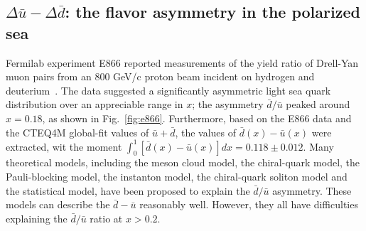 \subsection{$\Delta \bar{u} - \Delta \bar{d}$: the flavor asymmetry in the polarized sea}
 Fermilab experiment E866 reported measurements of the 
 yield ratio of Drell-Yan muon pairs
 from an 800 GeV/c proton beam incident on hydrogen and deuterium~\cite{e8661,e8662}. 
The data suggested a significantly  asymmetric light sea quark distribution over an 
 appreciable range in $x$; the asymmetry $\bar{d}/\bar{u}$ peaked around $x=0.18$, as shown in Fig.~\ref{fig:e866}.
 Furthermore, based on the E866 data and the CTEQ4M global-fit values of $\bar{u}+\bar{d}$,  
 the values of $\bar{d}(x) - \bar{u}(x)$ were extracted, wit the moment
 $\int_{0}^{1} \left[ \bar{d}(x) - \bar{u}(x) \right]dx = 0.118 \pm 0.012$.
 Many theoretical models, including the meson cloud model, the chiral-quark model,
the Pauli-blocking model, the instanton model, the chiral-quark soliton model and 
the statistical model, have been proposed to explain the $\bar{d}/\bar{u}$ asymmetry.
These models can describe the $\bar{d}-\bar{u}$ reasonably well. However, they all have difficulties 
explaining the $\bar{d}/\bar{u}$ ratio at $x>0.2$.  

